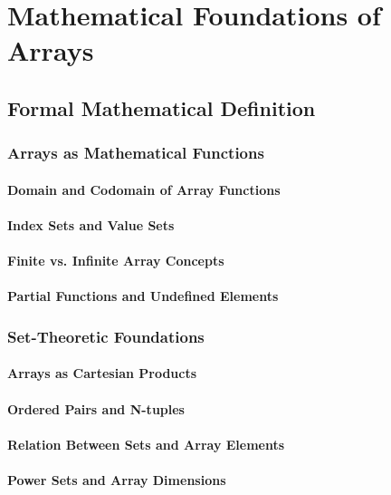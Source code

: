\documentclass[12pt, oneside]{book}
\begin{document}

\chapter{Mathematical Foundations of Arrays}

\section{Formal Mathematical Definition}
\subsection{Arrays as Mathematical Functions}
\subsubsection{Domain and Codomain of Array Functions}
\subsubsection{Index Sets and Value Sets}
\subsubsection{Finite vs. Infinite Array Concepts}
\subsubsection{Partial Functions and Undefined Elements}

\subsection{Set-Theoretic Foundations}
\subsubsection{Arrays as Cartesian Products}
\subsubsection{Ordered Pairs and N-tuples}
\subsubsection{Relation Between Sets and Array Elements}
\subsubsection{Power Sets and Array Dimensions}
\end{document}

